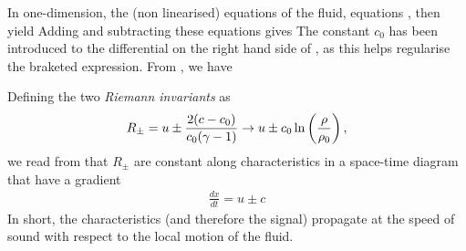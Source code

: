 In one-dimension, the (non linearised) equations of the fluid, equations , then yield
Adding and subtracting these equations gives
The constant $c_0$ has been introduced to the differential on the right hand side of ,
as this helps regularise the braketed expression.
From , we have 

Defining the two {\em Riemann invariants} as
\begin{align}
R_\pm = u \pm \frac{2(c-c_0)}{c_0(\gamma - 1)}  \rightarrow u \pm  c_0\ln\left( \frac{\rho}{\rho_0} \right),
\end{align}
we read from  that $R_\pm$ are constant along characteristics in a space-time diagram that have a gradient
\begin{align}
\frac{dx}{dt}= u\pm c
\end{align}
In short,
the characteristics (and therefore the signal) propagate at the speed of sound with respect to the local motion of the fluid.

